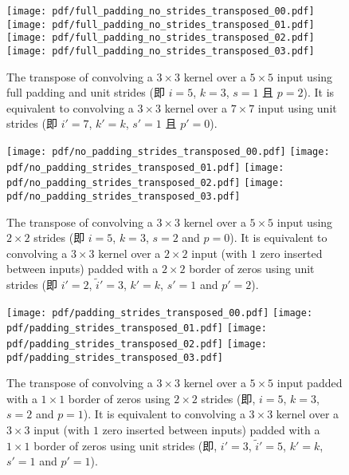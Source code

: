 \documentclass[notitlepage]{ctexrep}
\begin{document}
\begin{figure}[p]
    \centering
    \texttt{[image: pdf/full\_padding\_no\_strides\_transposed\_00.pdf]}
    \texttt{[image: pdf/full\_padding\_no\_strides\_transposed\_01.pdf]}
    \texttt{[image: pdf/full\_padding\_no\_strides\_transposed\_02.pdf]}
    \texttt{[image: pdf/full\_padding\_no\_strides\_transposed\_03.pdf]}
    \caption{\label{fig:full_padding_no_strides_transposed} The transpose of
        convolving a $3 \times 3$ kernel over a $5 \times 5$ input using full
        padding and unit strides (即 $i = 5$, $k = 3$, $s = 1$ 且 $p = 2$).
        It is equivalent to convolving a $3 \times 3$ kernel over a $7 \times 7$
        input using unit strides (即 $i' = 7$, $k' = k$, $s' = 1$ 且 $p' =
        0$).}
\end{figure}

\begin{figure}[p]
    \centering
    \texttt{[image: pdf/no\_padding\_strides\_transposed\_00.pdf]}
    \texttt{[image: pdf/no\_padding\_strides\_transposed\_01.pdf]}
    \texttt{[image: pdf/no\_padding\_strides\_transposed\_02.pdf]}
    \texttt{[image: pdf/no\_padding\_strides\_transposed\_03.pdf]}
    \caption{\label{fig:no_padding_strides_transposed} The transpose of
        convolving a $3 \times 3$ kernel over a $5 \times 5$ input using $2
        \times 2$ strides (即 $i = 5$, $k = 3$, $s = 2$ and $p = 0$). It is
        equivalent to convolving a $3 \times 3$ kernel over a $2 \times 2$ input
        (with $1$ zero inserted between inputs) padded with a $2 \times 2$
        border of zeros using unit strides (即 $i' = 2$, $\tilde{i}' = 3$, $k'
        = k$, $s' = 1$ and $p' = 2$).}
\end{figure}

\begin{figure}[p]
    \centering
    \texttt{[image: pdf/padding\_strides\_transposed\_00.pdf]}
    \texttt{[image: pdf/padding\_strides\_transposed\_01.pdf]}
    \texttt{[image: pdf/padding\_strides\_transposed\_02.pdf]}
    \texttt{[image: pdf/padding\_strides\_transposed\_03.pdf]}
    \caption{\label{fig:padding_strides_transposed} The transpose of convolving
        a $3 \times 3$ kernel over a $5 \times 5$ input padded with a $1 \times
        1$ border of zeros using $2 \times 2$ strides (即, $i = 5$, $k = 3$, $s
        = 2$ and $p = 1$). It is equivalent to convolving a $3 \times 3$ kernel
        over a $3 \times 3$ input (with $1$ zero inserted between inputs) padded
        with a $1 \times 1$ border of zeros using unit strides (即, $i' = 3$,
        $\tilde{i}' = 5$, $k' = k$, $s' = 1$ and $p' = 1$).}
\end{figure}
\end{document}
